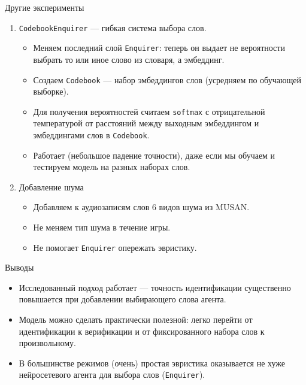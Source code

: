 \documentclass[aspectratio=43]{beamer}
\newcommand{\enquirer}{\texttt{Enquirer}}
\begin{document}
\begin{frame}{Другие эксперименты}
    \begin{enumerate}
        \item \texttt{CodebookEnquirer} --- гибкая система выбора слов.
        \begin{itemize}
            \item Меняем последний слой \enquirer{}: теперь он выдает не вероятности
            выбрать то или иное слово из словаря, а эмбеддинг.
            \item Создаем \texttt{Codebook} --- набор эмбеддингов слов
            (усредняем по обучающей выборке).
            \item Для получения вероятностей считаем \texttt{softmax} с
            отрицательной температурой от расстояний между выходным эмбеддингом
            и эмбеддингами слов в \texttt{Codebook}.
            \item Работает (небольшое падение точности), даже если мы обучаем
            и тестируем модель на разных наборах слов.
        \end{itemize}

        \item Добавление шума
        \begin{itemize}
            \item Добавляем к аудиозаписям слов 6 видов шума из MUSAN\@.
            \item Не меняем тип шума в течение игры.
            \item Не помогает \enquirer{} опережать эвристику.
        \end{itemize}
    \end{enumerate}
\end{frame}

\begin{frame}{Выводы}
    \begin{itemize}
        \item Исследованный подход работает --- точность идентификации 
        существенно повышается при добавлении выбирающего слова
        агента.
        \item Модель можно сделать практически полезной: легко перейти от
        идентификации к верификации и от фиксированного набора слов к
        произвольному.
        \item В большинстве режимов (очень) простая эвристика оказывается не хуже
        нейросетевого агента для выбора слов (\enquirer{}).
    \end{itemize}
\end{frame}

\end{document}
